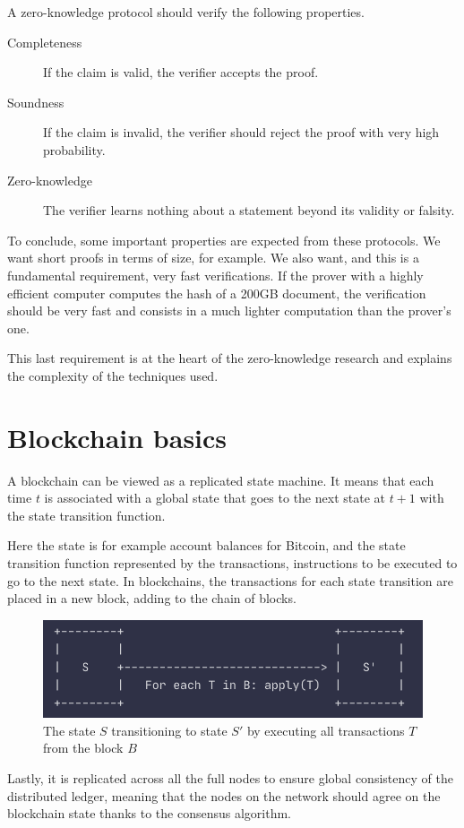 A zero-knowledge protocol should verify the following properties.
\begin{description}
    \item[Completeness] If the claim is valid, the verifier accepts the proof.
\item[Soundness] If the claim is invalid, the verifier should reject the proof with very high probability.

\item[Zero-knowledge] The verifier learns nothing about a statement beyond its validity or falsity.
\end{description}

To conclude, some important properties are expected from these protocols. We want  short proofs in terms of size, for example. We also want, and this is a fundamental requirement, very fast verifications. If the prover with a highly efficient computer computes the hash of a 200GB document, the verification should be very fast and consists in a much lighter computation than the prover's one.

This last requirement is at the heart of the zero-knowledge research and explains the complexity of the techniques used.


\section{Blockchain basics}

A blockchain can be viewed as a replicated state machine. It means that  each time $t$ is associated with a global state that goes to the next state at $t+1$ with the state transition function. 

Here the state is for example account balances for Bitcoin, and the state transition function represented by the transactions, instructions to be executed to go to the next state.
In blockchains, the transactions for each state transition are placed in a new block, adding to the chain of blocks.
\begin{figure}[H]
\centering
\includegraphics[width=0.6\linewidth]{background/state_transition.png}
    \caption{The state $S$ transitioning to state $S'$ by executing all transactions $T$ from the block $B$ \cite{statemachine}}
    \label{fig:state_transition}
\end{figure}
Lastly, it is replicated across all the full nodes to ensure global consistency of the distributed ledger, meaning that the nodes on the network should agree on the blockchain state thanks to the consensus algorithm.

